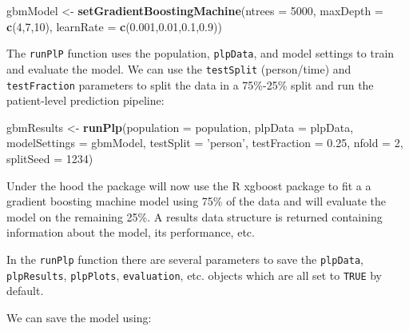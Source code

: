 \documentclass[11pt]{book}
\newenvironment{Shaded}{\begin{snugshade}}{\end{snugshade}}
\newcommand{\DataTypeTok}[1]{\textcolor[rgb]{0.13,0.29,0.53}{#1}}
\newcommand{\DecValTok}[1]{\textcolor[rgb]{0.00,0.00,0.81}{#1}}
\newcommand{\FloatTok}[1]{\textcolor[rgb]{0.00,0.00,0.81}{#1}}
\newcommand{\KeywordTok}[1]{\textcolor[rgb]{0.13,0.29,0.53}{\textbf{#1}}}
\newcommand{\NormalTok}[1]{#1}
\newcommand{\StringTok}[1]{\textcolor[rgb]{0.31,0.60,0.02}{#1}}
\theoremstyle{definition}
\theoremstyle{definition}
\theoremstyle{definition}
\theoremstyle{remark}
\begin{document}
\begin{Shaded}
\begin{Highlighting}[]
\NormalTok{gbmModel <-}\StringTok{ }\KeywordTok{setGradientBoostingMachine}\NormalTok{(}\DataTypeTok{ntrees =} \DecValTok{5000}\NormalTok{, }
                                       \DataTypeTok{maxDepth =} \KeywordTok{c}\NormalTok{(}\DecValTok{4}\NormalTok{,}\DecValTok{7}\NormalTok{,}\DecValTok{10}\NormalTok{), }
                                       \DataTypeTok{learnRate =} \KeywordTok{c}\NormalTok{(}\FloatTok{0.001}\NormalTok{,}\FloatTok{0.01}\NormalTok{,}\FloatTok{0.1}\NormalTok{,}\FloatTok{0.9}\NormalTok{))}
\end{Highlighting}
\end{Shaded}

The \texttt{runPlP} function uses the population, \texttt{plpData}, and model settings to train and evaluate the model. We can use the \texttt{testSplit} (person/time) and \texttt{testFraction} parameters to split the data in a 75\%-25\% split and run the patient-level prediction pipeline:

\begin{Shaded}
\begin{Highlighting}[]
\NormalTok{gbmResults <-}\StringTok{ }\KeywordTok{runPlp}\NormalTok{(}\DataTypeTok{population =}\NormalTok{ population, }
                     \DataTypeTok{plpData =}\NormalTok{ plpData, }
                     \DataTypeTok{modelSettings =}\NormalTok{ gbmModel, }
                     \DataTypeTok{testSplit =} \StringTok{'person'}\NormalTok{,}
                     \DataTypeTok{testFraction =} \FloatTok{0.25}\NormalTok{, }
                     \DataTypeTok{nfold =} \DecValTok{2}\NormalTok{, }
                     \DataTypeTok{splitSeed =} \DecValTok{1234}\NormalTok{)}
\end{Highlighting}
\end{Shaded}

Under the hood the package will now use the R xgboost package to fit a a gradient boosting machine model using 75\% of the data and will evaluate the model on the remaining 25\%. A results data structure is returned containing information about the model, its performance, etc.

In the \texttt{runPlp} function there are several parameters to save the \texttt{plpData}, \texttt{plpResults}, \texttt{plpPlots}, \texttt{evaluation}, etc. objects which are all set to \texttt{TRUE} by default.

We can save the model using:
\end{document}

